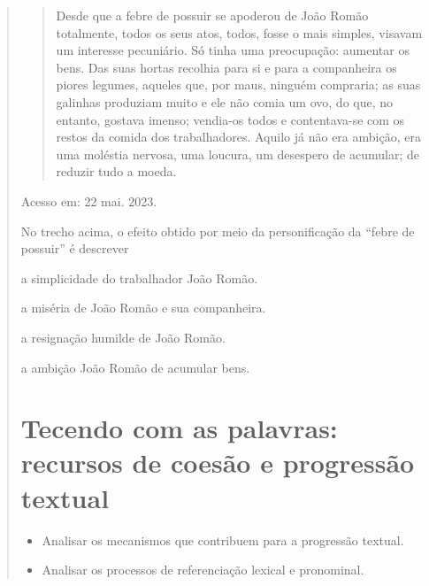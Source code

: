 \begin{quote}
{\begin{quote}

Desde que a febre de possuir se apoderou de João Romão totalmente, todos os seus atos, todos, 
fosse o mais simples, visavam um interesse pecuniário. Só tinha uma preocupação: aumentar 
os bens. Das suas hortas recolhia para si e para a companheira os piores legumes, aqueles que,
por maus, ninguém compraria; as suas galinhas produziam muito e ele não comia um ovo, do que, 
no entanto, gostava imenso; vendia-os todos e contentava-se com os restos da comida dos 
trabalhadores. Aquilo já não era ambição, era uma moléstia nervosa, uma loucura, um desespero
de acumular; de reduzir tudo a moeda.

\end{quote}

Acesso em: 22 mai. 2023.}

No trecho acima, o efeito obtido por meio da personificação da ``febre de possuir'' é descrever

\begin{escolha}
  
  \item a simplicidade do trabalhador João Romão. 
  
  \item a miséria de João Romão e sua companheira.
  
  \item a resignação humilde de João Romão. 
  
  \item a ambição João Romão de acumular bens. 

\end{escolha}


\chapter{Tecendo com as palavras: recursos de coesão e progressão textual}


\begin{itemize}

  \item Analisar os mecanismos que contribuem para a progressão textual.

  \item Analisar os processos de referenciação lexical e pronominal.


\end{itemize}
\end{quote}
